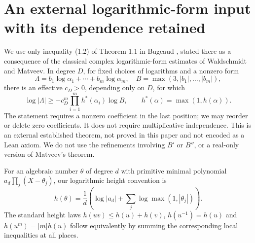 \documentclass[11pt]{amsart}
\theoremstyle{definition}\newtheorem{definition}[theorem]{Definition}
\theoremstyle{remark}\newtheorem{remark}[theorem]{Remark}
\begin{document}
\section{An external logarithmic-form input with its dependence retained}
We use only inequality (1.2) of Theorem 1.1 in Bugeaud \cite{bugeaud}, stated there as a consequence of the classical complex logarithmic-form estimates of Waldschmidt and Matveev. In degree $D$, for fixed choices of logarithms and a nonzero form
\[
 \Lambda=b_1\log\alpha_1+\cdots+b_m\log\alpha_m,
 \quad B=\max(3,|b_1|,\ldots,|b_m|),
\]
there is an effective $c_D>0$, depending only on $D$, for which
\begin{equation}\label{eq:external}
 \log|\Lambda|\ge-c_D^m\prod_{i=1}^m h^*(\alpha_i)\log B,
 \qquad h^*(\alpha)=\max(1,h(\alpha)).
\end{equation}
The statement requires a nonzero coefficient in the last position; we may reorder or delete zero coefficients. It does not require multiplicative independence. This is an external established theorem, not proved in this paper and not encoded as a Lean axiom. We do not use the refinements involving $B'$ or $B''$, or a real-only version of Matveev's theorem.

For an algebraic number $\theta$ of degree $d$ with primitive minimal polynomial $a_d\prod_j(X-\theta_j)$, our logarithmic height convention is
\[
 h(\theta)=\frac1d\left(\log|a_d|+\sum_j\log\max(1,|\theta_j|)\right).
\]
The standard height laws $h(uv)\le h(u)+h(v)$, $h(u^{-1})=h(u)$ and $h(u^m)=|m|h(u)$ follow equivalently by summing the corresponding local inequalities at all places.
\end{document}
